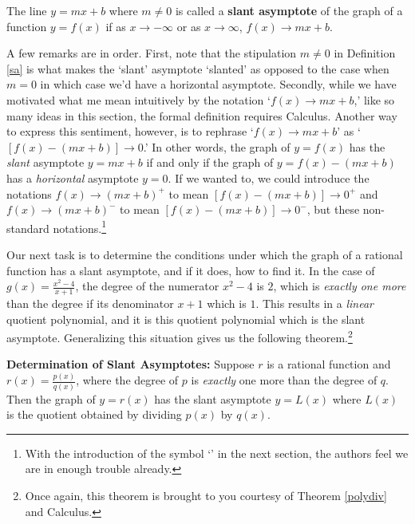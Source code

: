 \begin{tcolorbox}

\begin{defn} \label{sa} The line $y = mx+b$ where $m \neq 0$  is called a \textbf{slant asymptote} of the graph of a function $y=f(x)$ if as $x \rightarrow -\infty$ or as $x \rightarrow \infty$, $f(x)  \rightarrow mx+b$.


\end{defn}
\end{tcolorbox}

A few remarks are in order.  First, note that the stipulation $m \neq 0$ in Definition \ref{sa} is what makes the `slant' asymptote `slanted' as opposed to the case when $m=0$ in which case we'd have a horizontal asymptote.  Secondly, while we have motivated what me mean intuitively by the notation `$f(x)  \rightarrow mx+b$,' like so many ideas in this section, the formal definition requires Calculus.  Another way to express this sentiment, however, is to rephrase `$f(x)  \rightarrow mx+b$' as `$[f(x) - (mx+b)] \rightarrow 0$.'  In other words, the graph of $y=f(x)$ has the \textit{slant} asymptote $y = mx+b$ if and only if the graph of $y = f(x) - (mx+b)$ has a \textit{horizontal} asymptote $y=0$.  If we wanted to, we could introduce the notations $f(x) \rightarrow (mx+b)^{+}$ to mean $[f(x)-(mx+b)] \rightarrow 0^{+}$ and $f(x) \rightarrow (mx+b)^{-}$ to mean $[f(x)-(mx+b)] \rightarrow 0^{-}$, but these non-standard notations.\footnote{With the introduction of the symbol `\textinterrobang' in the next section, the authors feel we are in enough trouble already.}

Our next task is to determine the conditions under which the graph of a rational function has a slant asymptote, and if it does, how to find it.  In the case of $g(x) = \frac{x^2-4}{x+1}$, the degree of the numerator $x^2-4$ is $2$, which is \textit{exactly one more} than the degree if its denominator $x+1$ which is $1$.  This results in a \textit{linear} quotient polynomial, and it is this quotient polynomial which is the slant asymptote.  Generalizing this situation gives us the following theorem.\footnote{Once again, this theorem is brought to you courtesy of Theorem \ref{polydiv} and Calculus.}

\begin{tcolorbox}

\begin{thm} \textbf{Determination of Slant Asymptotes:} \label{sathm} Suppose $r$ is a rational function and $r(x) = \frac{p(x)}{q(x)}$, where the degree of $p$ is \textit{exactly} one more than the degree of $q$.  Then the graph of $y=r(x)$ has  the slant asymptote $y=L(x)$ where $L(x)$ is the quotient obtained by dividing $p(x)$ by $q(x)$.

\end{thm}
\end{tcolorbox}

